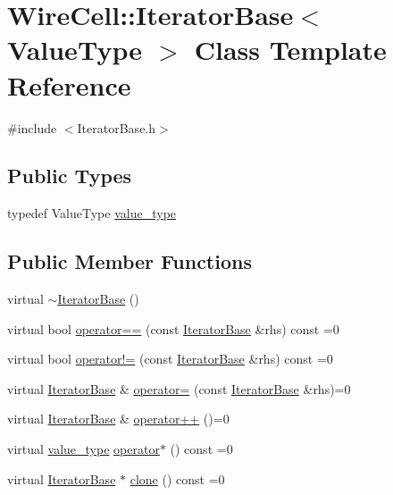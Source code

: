 \hypertarget{class_wire_cell_1_1_iterator_base}{}\section{Wire\+Cell\+:\+:Iterator\+Base$<$ Value\+Type $>$ Class Template Reference}
\label{class_wire_cell_1_1_iterator_base}


{\ttfamily \#include $<$Iterator\+Base.\+h$>$}

\subsection*{Public Types}
\begin{DoxyCompactItemize}
\item 
typedef Value\+Type \hyperlink{class_wire_cell_1_1_iterator_base_af263e640de56fa27ae9eed3cddd7a9e0}{value\+\_\+type}
\end{DoxyCompactItemize}
\subsection*{Public Member Functions}
\begin{DoxyCompactItemize}
\item 
virtual \hyperlink{class_wire_cell_1_1_iterator_base_ae1705c915b813d46644cfeb09c94b505}{$\sim$\+Iterator\+Base} ()
\item 
virtual bool \hyperlink{class_wire_cell_1_1_iterator_base_aa2dc364b16da871fd63983ec04b58ca0}{operator==} (const \hyperlink{class_wire_cell_1_1_iterator_base}{Iterator\+Base} \&rhs) const =0
\item 
virtual bool \hyperlink{class_wire_cell_1_1_iterator_base_a25557feb11a250eb324a33b7114f2f40}{operator!=} (const \hyperlink{class_wire_cell_1_1_iterator_base}{Iterator\+Base} \&rhs) const =0
\item 
virtual \hyperlink{class_wire_cell_1_1_iterator_base}{Iterator\+Base} \& \hyperlink{class_wire_cell_1_1_iterator_base_ad62dd2f5a05b89ce63ad9b9e62167856}{operator=} (const \hyperlink{class_wire_cell_1_1_iterator_base}{Iterator\+Base} \&rhs)=0
\item 
virtual \hyperlink{class_wire_cell_1_1_iterator_base}{Iterator\+Base} \& \hyperlink{class_wire_cell_1_1_iterator_base_a8f75296f57c6f4261dc3c4f7c085a5b8}{operator++} ()=0
\item 
virtual \hyperlink{class_wire_cell_1_1_iterator_base_af263e640de56fa27ae9eed3cddd7a9e0}{value\+\_\+type} \hyperlink{class_wire_cell_1_1_iterator_base_a24cb604201a8b614f8ee4aa8062ae63c}{operator$\ast$} () const =0
\item 
virtual \hyperlink{class_wire_cell_1_1_iterator_base}{Iterator\+Base} $\ast$ \hyperlink{class_wire_cell_1_1_iterator_base_a6bb7f1f53c37dc1518291f09f493f2be}{clone} () const =0
\end{DoxyCompactItemize}


